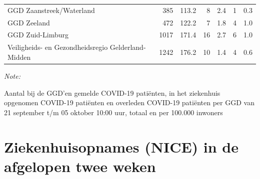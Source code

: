\documentclass[
  english,
  man,floatsintext]{apa6}
\begin{document}
\begin{table}
\begin{threeparttable}
\begin{tabular}{lrrrrrr}
GGD Zaanstreek/Waterland & 385 & 113.2 & 8 & 2.4 & 1 & 0.3\\
GGD Zeeland & 472 & 122.2 & 7 & 1.8 & 4 & 1.0\\
GGD Zuid-Limburg & 1017 & 171.4 & 16 & 2.7 & 6 & 1.0\\
Veiligheids- en Gezondheidsregio Gelderland-Midden & 1242 & 176.2 & 10 & 1.4 & 4 & 0.6\\
\bottomrule
\end{tabular}
\begin{tablenotes}
\item \textit{Note: } 
\item Aantal bij de GGD’en gemelde COVID-19 patiënten, in het ziekenhuis opgenomen COVID-19 patiënten en overleden COVID-19 patiënten per GGD van 21 september t/m 05 oktober 10:00 uur, totaal en per 100.000 inwoners
\end{tablenotes}
\end{threeparttable}
\endgroup{}
\end{table}

\newpage

\hypertarget{ziekenhuisopnames-nice-in-de-afgelopen-twee-weken}{%
\section{Ziekenhuisopnames (NICE) in de afgelopen twee weken}\label{ziekenhuisopnames-nice-in-de-afgelopen-twee-weken}}
\end{document}
